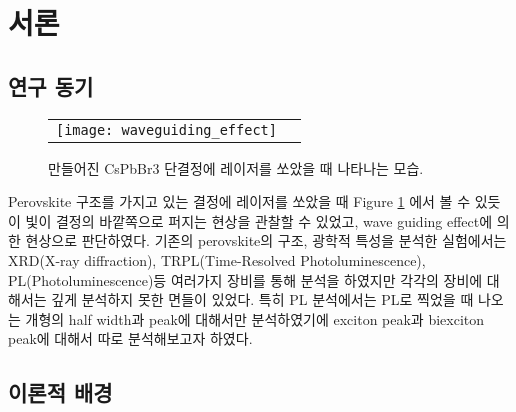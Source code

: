 
\section{서론}
\subsection{연구 동기}
\begin{figure}[H]
	\begin{center}
		\begin{tabular}{cc}
			\texttt{[image: waveguiding\_effect]}
		\end{tabular}
	\end{center}
	\caption{만들어진 CsPbBr3 단결정에 레이저를 쏘았을 때 나타나는 모습.}
	\label{fig:waveguide}  
\end{figure}
Perovskite 구조를 가지고 있는 결정에 레이저를 쏘았을 때 Figure \ref{fig:waveguide} 에서 볼 수 있듯이 빛이 결정의 바깥쪽으로 퍼지는 현상을 관찰할 수 있었고, wave guiding effect에 의한 현상으로 판단하였다. 기존의 perovskite의 구조, 광학적 특성을 분석한 실험에서는 XRD(X-ray diffraction), TRPL(Time-Resolved Photoluminescence), PL(Photoluminescence)등 여러가지 장비를 통해 분석을 하였지만 각각의 장비에 대해서는 깊게 분석하지 못한 면들이 있었다. 특히 PL 분석에서는 PL로 찍었을 때 나오는 개형의 half width과 peak에 대해서만 분석하였기에 exciton peak과 biexciton peak에 대해서 따로 분석해보고자 하였다. 
 

\subsection{이론적 배경}
